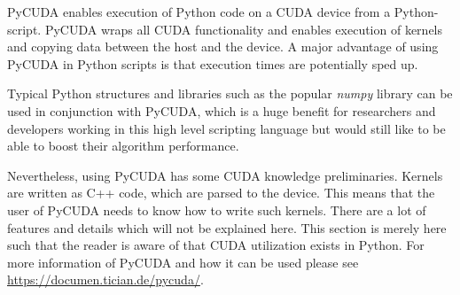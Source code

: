 PyCUDA enables execution of Python code on a CUDA device from a Python-script.
PyCUDA wraps all CUDA functionality and enables execution of kernels and copying data between the host and the device.
A major advantage of using PyCUDA in Python scripts is that execution times are potentially sped up.

Typical Python structures and libraries such as the popular \textit{numpy} library can be used in conjunction with PyCUDA, which is a huge benefit for researchers and developers working in this high level scripting language but would still like to be able to boost their algorithm performance.

Nevertheless, using PyCUDA has some CUDA knowledge preliminaries.
Kernels are written as C++ code, which are parsed to the device.
This means that the user of PyCUDA needs to know how to write such kernels.
There are a lot of features and details which will not be explained here.
This section is merely here such that the reader is aware of that CUDA utilization exists in Python.
For more information of PyCUDA and how it can be used please see \url{https://documen.tician.de/pycuda/}.